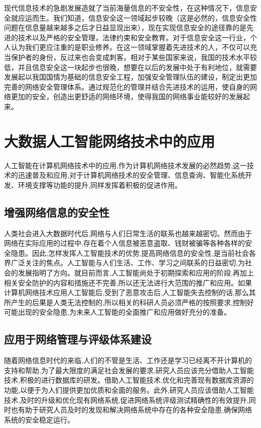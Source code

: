 \documentclass{article}
\begin{document}
现代信息技术的急剧发展造就了当前海量信息的不安全性，在这种情况下，信息安全就应运而生。我们知道，信息安全这一领域起步较晚（这是必然的，信息安全性问题在信息量越来越多之后才日益显现出来），现在实现信息安全的途径靠的是先进的技术以及严格的安全管理，法律约束和安全教育。对于信息安全这一行业，个人认为我们更应注重的是职业修养。在这一领域掌握着先进技术的人，不仅可以充当保护者的身份，反过来也会变成刺客。相对于某些国家来说，我国的技术水平较低，并且信息安全这一块起步也很晚，想要在以后的发展中处于有利地位，就需要发展起以我国国情为基础的信息安全工程，加强安全管理队伍的建设，制定出更加完善的网络安全管理体系。通过规范化的管理并结合先进技术的运用，使自身的网络更加的安全，创造出更舒适的网络环境，使得我国的网络事业能较好的发展起来。
\section{大数据人工智能网络技术中的应用}
人工智能\citep{AI}在计算机网络技术中的应用,作为计算机网络技术发展的必然趋势,这一技术的迅速普及和应用,对于计算机网络技术的安全管理、信息查询、智能化系统开发、环境支撑等功能的提升,同样发挥着积极的促进作用。
\subsection{增强网络信息的安全性}
人类社会进入大数据时代后,网络与人们日常生活的联系也越来越密切。然而由于网络在实际应用的过程中,存在着个人信息被恶意盗取、钱财被骗等各种各样的安全隐患。因此,怎样发挥人工智能技术的优势,提高网络信息的安全性,是当前社会各界广泛关注的焦点。人工智能与人们生活、工作、学习之间联系的日益密切,为社会的发展指明了方向。就目前而言,人工智能尚处于初期探索和应用的阶段,再加上相关安全防护的内容和措施还不完善,所以还无法进行大范围的推广和应用。如果计算机网络技术应用人工智能后,受到了恶意攻击后,人工智能失去控制的话,那么其所产生的后果是人类无法控制的,所以相关的科研人员必须严格的按照要求,控制好可能出现的安全隐患,为未来人工智能的全面推广和应用做好充分的准备。
\subsection{应用于网络管理与评级体系建设}
随着网络信息时代的来临,人们的不管是生活、工作还是学习已经离不开计算机的支持和帮助,为了最大限度的满足社会发展的要求,研究人员应该充分借助人工智能技术,积极的进行数据库的研发。借助人工智能技术,优化和完善现有数据库资源的功能,以便于为人们提供更加优质和全面的服务。此外,研究人员应该借助人工智能技术,及时的升级和优化现有网络系统,促进网络系统评级测试精确性的有效提升,同时也有助于研究人员及时的发现和解决网络系统中存在的各种安全隐患,确保网络系统的安全稳定运行。
\end{document}
